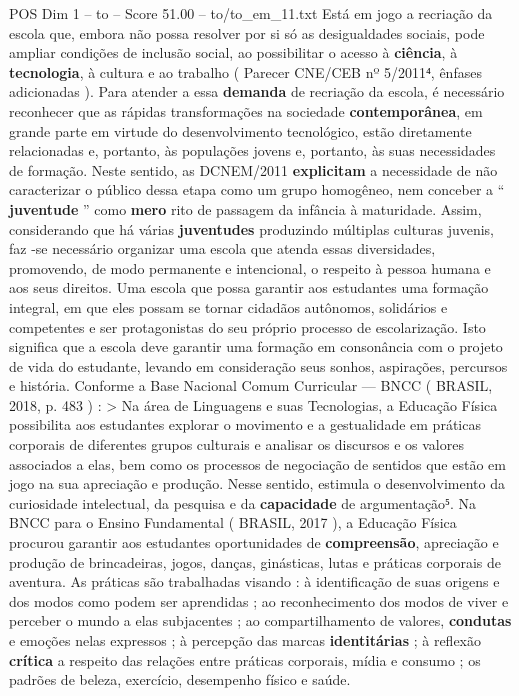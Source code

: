 \begin{textsample}{POS Dim 1 – to – Score 51.00 – to/to\_em\_11.txt}
Está em jogo a recriação da escola que, embora não possa resolver por si só as desigualdades sociais, pode ampliar condições de inclusão social, ao possibilitar o acesso à \textbf{ciência}, à \textbf{tecnologia}, à cultura e ao trabalho ( Parecer CNE/CEB nº 5/2011⁴, ênfases adicionadas ).
Para atender a essa \textbf{demanda} de recriação da escola, é necessário reconhecer que as rápidas transformações na sociedade \textbf{contemporânea}, em grande parte em virtude do desenvolvimento tecnológico, estão diretamente relacionadas e, portanto, às populações jovens e, portanto, às suas necessidades de formação.
Neste sentido, as DCNEM/2011 \textbf{explicitam} a necessidade de não caracterizar o público dessa etapa como um grupo homogêneo, nem conceber a “ \textbf{juventude} ” como \textbf{mero} rito de passagem da infância à maturidade.
Assim, considerando que há várias \textbf{juventudes} produzindo múltiplas culturas juvenis, faz -se necessário organizar uma escola que atenda essas diversidades, promovendo, de modo permanente e intencional, o respeito à pessoa humana e aos seus direitos.
Uma escola que possa garantir aos estudantes uma formação integral, em que eles possam se tornar cidadãos autônomos, solidários e competentes e ser protagonistas do seu próprio processo de escolarização.
Isto significa que a escola deve garantir uma formação em consonância com o projeto de vida do estudante, levando em consideração seus sonhos, aspirações, percursos e história.
Conforme a Base Nacional Comum Curricular — BNCC ( BRASIL, 2018, p. 483 ) : > Na área de Linguagens e suas Tecnologias, a Educação Física possibilita aos estudantes explorar o movimento e a gestualidade em práticas corporais de diferentes grupos culturais e analisar os discursos e os valores associados a elas, bem como os processos de negociação de sentidos que estão em jogo na sua apreciação e produção.
Nesse sentido, estimula o desenvolvimento da curiosidade intelectual, da pesquisa e da \textbf{capacidade} de argumentação⁵.
Na BNCC para o Ensino Fundamental ( BRASIL, 2017 ), a Educação Física procurou garantir aos estudantes oportunidades de \textbf{compreensão}, apreciação e produção de brincadeiras, jogos, danças, ginásticas, lutas e práticas corporais de aventura.
As práticas são trabalhadas visando : à identificação de suas origens e dos modos como podem ser aprendidas ; ao reconhecimento dos modos de viver e perceber o mundo a elas subjacentes ; ao compartilhamento de valores, \textbf{condutas} e emoções nelas expressos ; à percepção das marcas \textbf{identitárias} ; à reflexão \textbf{crítica} a respeito das relações entre práticas corporais, mídia e consumo ; os padrões de beleza, exercício, desempenho físico e saúde.

\end{textsample}
